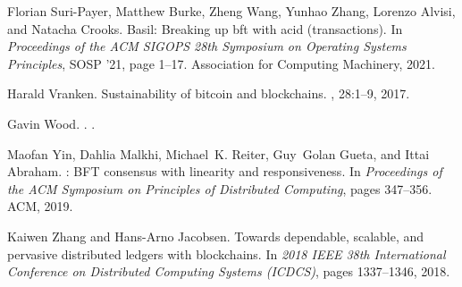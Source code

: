 \documentclass[11pt]{article}
\begin{document}
\begin{thebibliography}{10}
Florian Suri-Payer, Matthew Burke, Zheng Wang, Yunhao Zhang, Lorenzo Alvisi,
  and Natacha Crooks.
\newblock Basil: Breaking up bft with acid (transactions).
\newblock In {\em Proceedings of the ACM SIGOPS 28th Symposium on Operating
  Systems Principles}, SOSP '21, page 1–17. Association for Computing
  Machinery, 2021.

Harald Vranken.
\newblock Sustainability of bitcoin and blockchains.
, 28:1--9, 2017.

Gavin Wood.
.
.

Maofan Yin, Dahlia Malkhi, Michael~K. Reiter, Guy~Golan Gueta, and Ittai
  Abraham.
: {BFT} consensus with linearity and responsiveness.
\newblock In {\em Proceedings of the ACM Symposium on Principles of Distributed
  Computing}, pages 347--356. ACM, 2019.

Kaiwen Zhang and Hans-Arno Jacobsen.
\newblock Towards dependable, scalable, and pervasive distributed ledgers with
  blockchains.
\newblock In {\em 2018 IEEE 38th International Conference on Distributed
  Computing Systems (ICDCS)}, pages 1337--1346, 2018.

\end{thebibliography}
\end{document}
